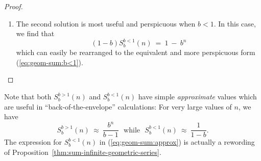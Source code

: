 \begin{proof}
\begin{enumerate}
\item
The second solution is most useful and perspicuous when $b < 1$.  In this
case, we find that
\[ (1-b) S^{b<1}_{b}(n) \ = \ 1 \ - \ b^n \]
which can easily be rearranged to the equivalent and more
perspicuous form (\ref{eq:geom-sum:b<1}).
\end{enumerate}
\end{proof}

Note that both $S^{b>1}_{b}(n)$ and $S^{b<1}_{b}(n)$ have simple {\em
  approximate} values which are useful in ``back-of-the-envelope''
calculations: For very large values of $n$, we have
\begin{equation}
\label{eq:geom-sum:approx}
S^{b>1}_{b}(n) \ \approx \ \frac{b^n}{b-1} \ \ \
\mbox{while} \ \ \
S^{b<1}_{b}(n) \ \approx \ \frac{1}{1-b} .
\end{equation}
The expression for $S^{b<1}_{b}(n)$ in (\ref{eq:geom-sum:approx}) is
actually a rewording of
Proposition~\ref{thm:sum-infinite-geometric-series}.

\medskip

